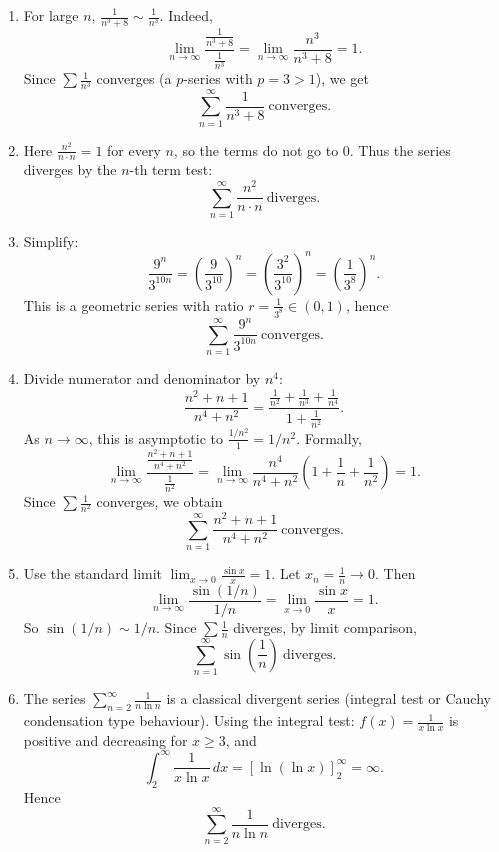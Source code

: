 \documentclass[12pt]{article}
\begin{document}
\begin{enumerate}[label=(\alph*)]
\item For large \(n\), \(\frac{1}{n^3+8}\sim \frac{1}{n^3}\).
Indeed,
\[
\lim_{n\to\infty}\frac{\frac{1}{n^3+8}}{\frac{1}{n^3}}=\lim_{n\to\infty}\frac{n^3}{n^3+8}=1.
\]
Since \(\sum \frac{1}{n^3}\) converges (a \(p\)-series with \(p=3>1\)), we get
\[
\boxed{\sum_{n=1}^{\infty}\frac{1}{n^3+8}\ \text{converges}.}
\]

\item Here \(\frac{n^2}{n\cdot n}=1\) for every \(n\), so the terms do not go to \(0\).
Thus the series diverges by the \(n\)-th term test:
\[
\boxed{\sum_{n=1}^{\infty}\frac{n^2}{n\cdot n}\ \text{diverges}.}
\]

\item Simplify:
\[
\frac{9^n}{3^{10n}}=\left(\frac{9}{3^{10}}\right)^n=\left(\frac{3^2}{3^{10}}\right)^n=\left(\frac{1}{3^8}\right)^n.
\]
This is a geometric series with ratio \(r=\frac{1}{3^8}\in(0,1)\), hence
\[
\boxed{\sum_{n=1}^{\infty}\frac{9^n}{3^{10n}}\ \text{converges}.}
\]

\item Divide numerator and denominator by \(n^4\):
\[
\frac{n^2+n+1}{n^4+n^2}
=\frac{\frac{1}{n^2}+\frac{1}{n^3}+\frac{1}{n^4}}{1+\frac{1}{n^2}}.
\]
As \(n\to\infty\), this is asymptotic to \(\frac{1/n^2}{1}=1/n^2\). Formally,
\[
\lim_{n\to\infty}\frac{\frac{n^2+n+1}{n^4+n^2}}{\frac{1}{n^2}}
=\lim_{n\to\infty}\frac{n^4}{n^4+n^2}\left(1+\frac{1}{n}+\frac{1}{n^2}\right)
=1.
\]
Since \(\sum \frac{1}{n^2}\) converges, we obtain
\[
\boxed{\sum_{n=1}^{\infty}\frac{n^2+n+1}{n^4+n^2}\ \text{converges}.}
\]

\item Use the standard limit \(\lim_{x\to 0}\frac{\sin x}{x}=1\). Let \(x_n=\frac{1}{n}\to 0\). Then
\[
\lim_{n\to\infty}\frac{\sin(1/n)}{1/n}
=\lim_{x\to 0}\frac{\sin x}{x}=1.
\]
So \(\sin(1/n)\sim 1/n\). Since \(\sum \frac{1}{n}\) diverges, by limit comparison,
\[
\boxed{\sum_{n=1}^{\infty}\sin\!\left(\frac{1}{n}\right)\ \text{diverges}.}
\]

\item The series \(\sum_{n=2}^\infty \frac{1}{n\ln n}\) is a classical divergent series (integral test or Cauchy condensation type behaviour).
Using the integral test: \(f(x)=\frac{1}{x\ln x}\) is positive and decreasing for \(x\ge 3\), and
\[
\int_2^\infty \frac{1}{x\ln x}\,dx
=\left[\ln(\ln x)\right]_{2}^{\infty}
=\infty.
\]
Hence
\[
\boxed{\sum_{n=2}^{\infty}\frac{1}{n\ln n}\ \text{diverges}.}
\]


\end{enumerate}
\end{document}
